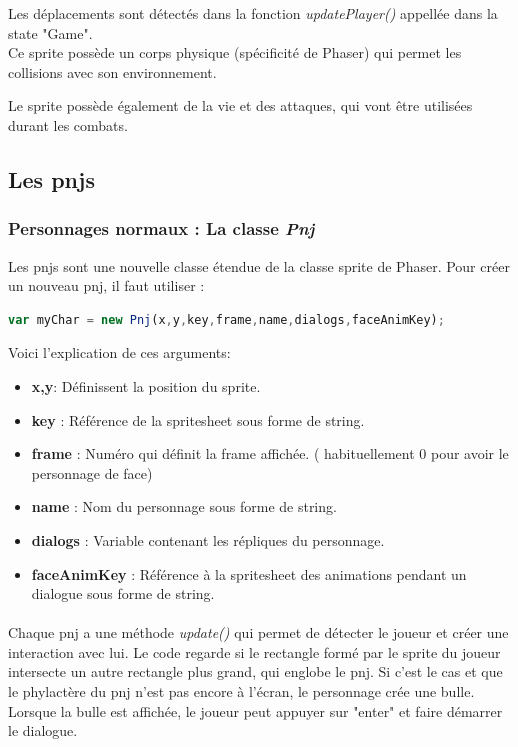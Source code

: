 \documentclass[11pt]{article}
\begin{document}
\begin{appendices}
Les déplacements sont détectés dans la fonction \textit{updatePlayer()} appellée dans la state "Game".\\


Ce sprite possède un corps physique (spécificité de Phaser) qui permet les collisions avec son environnement.


Le sprite possède également de la vie et des attaques, qui vont être utilisées durant les combats. 
\subsection{Les pnjs}
\subsubsection{Personnages normaux : La classe \textit{Pnj}}
Les pnjs sont une nouvelle classe étendue de la classe sprite de Phaser. Pour créer un nouveau pnj, il faut utiliser :\\
 \begin{lstlisting}[language=JavaScript]
var myChar = new Pnj(x,y,key,frame,name,dialogs,faceAnimKey);
\end{lstlisting}
Voici l'explication de ces arguments:
\begin{itemize}
\item \textbf{x,y}: Définissent la position du sprite.
\item \textbf{key} : Référence de la spritesheet sous forme de string.
\item \textbf{frame} : Numéro qui définit la frame affichée. ( habituellement 0 pour avoir le personnage de face) 
\item \textbf{name} : Nom du personnage sous forme de string.
\item \textbf{dialogs} : Variable contenant les répliques du personnage.
\item \textbf{faceAnimKey} : Référence à la spritesheet des animations pendant un dialogue sous forme de string.
\end{itemize}
\paragraph{}

Chaque pnj a une méthode \textit{update()} qui permet de détecter le joueur et créer une interaction avec lui. Le code regarde si le rectangle formé par le sprite du joueur intersecte un autre rectangle plus grand, qui englobe le pnj. Si c'est le cas et que le phylactère du pnj n'est pas encore à l'écran, le personnage crée une bulle. Lorsque la bulle est affichée, le joueur peut appuyer sur "enter" et faire démarrer le dialogue.\\


\end{appendices}
\end{document}
